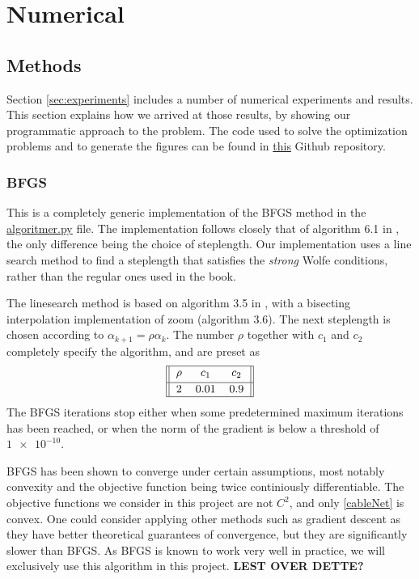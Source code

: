 \section{Numerical}
\subsection{Methods}
Section \ref{sec:experiments} includes a number of numerical experiments and results. This section explains how we arrived at those results, by showing our programmatic approach to the problem. The code used to solve the optimization problems and to generate the figures can be found in \href{https://github.com/otkulseng/Opt1_Project}{this} Github repository.
\subsubsection{BFGS}
This is a completely generic implementation of the BFGS method in the \href{https://github.com/otkulseng/Opt1_Project/blob/main/Kode/algoritmer.py}{algoritmer.py} file. The implementation follows closely that of algorithm 6.1 in \cite{NW}, the only difference being the choice of steplength. Our implementation uses a line search method to find a steplength that satisfies the \emph{strong} Wolfe conditions, rather than the regular ones used in the book.

The linesearch method is based on algorithm 3.5 in \cite{NW}, with a bisecting interpolation implementation of zoom (algorithm 3.6). The next steplength is chosen according to $\alpha_{k+1} = \rho \alpha_k$. The number $\rho$ together with $c_1$ and $c_2$ completely specify the algorithm, and are preset as
\begin{gather}    
\begin{tabular}{||c c c||} 
 \hline
 $\rho$ & $c_1$ & $c_2$ \\ [0.5ex] 
 \hline
2 & 0.01 & 0.9  \\ 
 \hline
\end{tabular}
\end{gather}
The BFGS iterations stop either when some predetermined maximum iterations has been reached, or when the norm of the gradient is below a threshold of $\num{1e-10}$.

BFGS has been shown to converge under certain assumptions, most notably convexity and the objective function being twice continiously differentiable. The objective functions we consider in this project are not $C^2$, and only \eqref{cableNet} is convex. One could consider applying other methods such as gradient descent as they have better theoretical guarantees of convergence, but they are significantly slower than BFGS. As BFGS is known to work very well in practice, we will exclusively use this algorithm in this project. \textbf{LEST OVER DETTE?}

